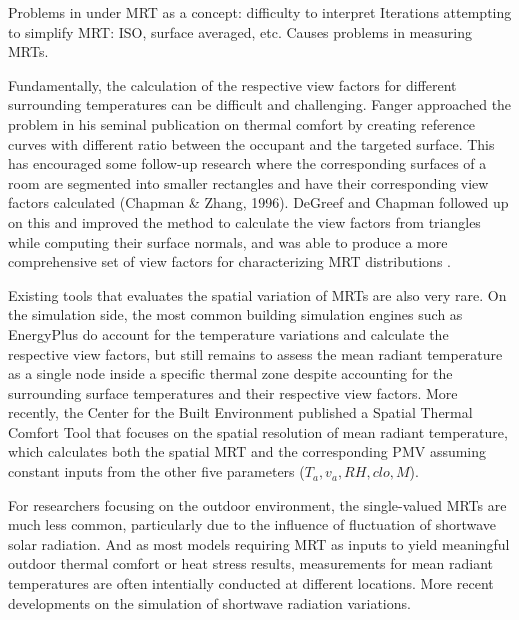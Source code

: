     Problems in under MRT as a concept: difficulty to interpret Iterations attempting to simplify MRT: ISO, surface averaged, etc. Causes problems in measuring MRTs. 

    Fundamentally, the calculation of the respective view factors for different surrounding temperatures can be difficult and challenging. Fanger approached the problem in his seminal publication on thermal comfort \cite{fanger_thermal_1970} by creating reference curves with different ratio between the occupant and the targeted surface. This has encouraged some follow-up research where the corresponding surfaces of a room are segmented into smaller rectangles and have their corresponding view factors calculated (Chapman \& Zhang, 1996). DeGreef and Chapman followed up on this and improved the method to calculate the view factors from triangles while computing their surface normals, and was able to produce a more comprehensive set of view factors for characterizing MRT distributions \cite{degreef_calculation_2017}. 

    Existing tools that evaluates the spatial variation of MRTs are also very rare. On the simulation side, the most common building simulation engines such as EnergyPlus \cite{energyplus_engineering_2013} do account for the temperature variations and calculate the respective view factors, but still remains to assess the mean radiant temperature as a single node inside a specific thermal zone despite accounting for the surrounding surface temperatures and their respective view factors. More recently, the Center for the Built Environment published a Spatial Thermal Comfort Tool \cite{arens_modeling_2015} that focuses on the spatial resolution of mean radiant temperature, which calculates both the spatial MRT and the corresponding PMV assuming constant inputs from the other five parameters ($T_a, v_a, RH, clo, M$).  

    For researchers focusing on the outdoor environment, the single-valued MRTs are much less common, particularly due to the influence of fluctuation of shortwave solar radiation\cite{middel_sky_2017}. And as most models requiring MRT as inputs to yield meaningful outdoor thermal comfort or heat stress results, measurements for mean radiant temperatures are often intentially conducted at different locations\cite{thorsson_different_2007,thorsson_thermal_2007}. More recent developments on the simulation of shortwave radiation variations. 
        
